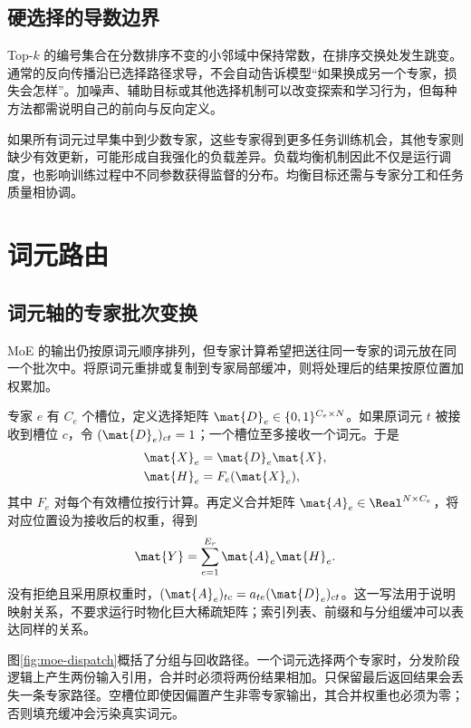 \documentclass[../textbook.tex]{subfiles}
\begin{document}
\subsection{硬选择的导数边界}
Top-$k$ 的编号集合在分数排序不变的小邻域中保持常数，在排序交换处发生跳变。通常的反向传播沿已选择路径求导，不会自动告诉模型“如果换成另一个专家，损失会怎样”。加噪声、辅助目标或其他选择机制可以改变探索和学习行为，但每种方法都需说明自己的前向与反向定义。

如果所有词元过早集中到少数专家，这些专家得到更多任务训练机会，其他专家则缺少有效更新，可能形成自我强化的负载差异。负载均衡机制因此不仅是运行调度，也影响训练过程中不同参数获得监督的分布。均衡目标还需与专家分工和任务质量相协调。

\section{词元路由}

\subsection{词元轴的专家批次变换}
MoE 的输出仍按原词元顺序排列，但专家计算希望把送往同一专家的词元放在同一个批次中。将原词元重排或复制到专家局部缓冲，则将处理后的结果按原位置加权累加。

专家 $e$ 有 $C_e$ 个槽位，定义选择矩阵 $\mat{D}_e\in\{0,1\}^{C_e\times N}$。如果原词元 $t$ 被接收到槽位 $c$，令 $(\mat{D}_e)_{ct}=1$；一个槽位至多接收一个词元。于是
\begin{equation}
\begin{aligned}
 \mat{X}_e &= \mat{D}_e\mat{X}, \\
 \mat{H}_e &= F_e(\mat{X}_e),
\end{aligned}
\end{equation}
其中 $F_e$ 对每个有效槽位按行计算。再定义合并矩阵 $\mat{A}_e\in\Real^{N\times C_e}$，将对应位置设为接收后的权重，得到
\begin{equation}
 \mat{Y}=\sum_{e=1}^{E_r}\mat{A}_e\mat{H}_e.
 \label{eq:moe-dispatch-combine}
\end{equation}
没有拒绝且采用原权重时，$(\mat{A}_e)_{tc}=a_{te}(\mat{D}_e)_{ct}$。这一写法用于说明映射关系，不要求运行时物化巨大稀疏矩阵；索引列表、前缀和与分组缓冲可以表达同样的关系。

图\ref{fig:moe-dispatch}概括了分组与回收路径。一个词元选择两个专家时，分发阶段逻辑上产生两份输入引用，合并时必须将两份结果相加。只保留最后返回结果会丢失一条专家路径。空槽位即使因偏置产生非零专家输出，其合并权重也必须为零；否则填充缓冲会污染真实词元。
\end{document}

